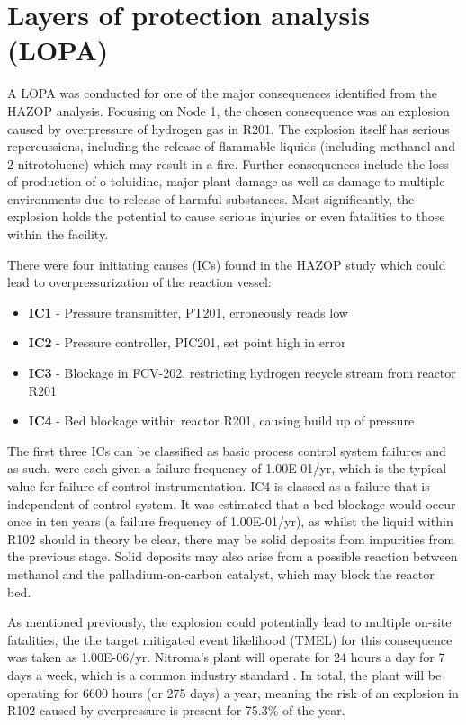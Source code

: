 \section{Layers of protection analysis (LOPA)}
\label{sec:LOPA}

A LOPA was conducted for one of the major consequences identified from the HAZOP analysis. Focusing on Node 1, the chosen consequence was an explosion caused by overpressure of hydrogen gas in R201. The explosion itself has serious repercussions, including the release of flammable liquids (including methanol and 2-nitrotoluene) which may result in a fire. Further consequences include the loss of production of o-toluidine, major plant damage as well as damage to multiple environments due to release of harmful substances. Most significantly, the explosion holds the potential to cause serious injuries or even fatalities to those within the facility. 

There were four initiating causes (ICs) found in the HAZOP study which could lead to overpressurization of the reaction vessel:

\begin{itemize}
\item \textbf{IC1} - Pressure transmitter, PT201, erroneously reads low 
\item \textbf{IC2} -  Pressure controller, PIC201, set point high in error
\item \textbf{IC3 }- Blockage in FCV-202, restricting hydrogen recycle stream from reactor R201 
\item \textbf{IC4} - Bed blockage within reactor R201, causing build up of pressure 
\end{itemize}

The first three ICs can be classified as basic process control system failures and as such, were each given a failure frequency of \nu1.00E-01/yr, which is the typical value for failure of control instrumentation. IC4 is classed as a failure that is independent of control system. It was estimated that a bed blockage would occur once in ten years (a failure frequency of 1.00E-01/yr), as whilst the liquid within R102 should in theory be clear, there may be solid deposits from impurities from the previous stage. Solid deposits may also arise from a possible reaction between methanol and the palladium-on-carbon catalyst, which may block the reactor bed. 

As mentioned previously, the explosion could potentially lead to multiple on-site fatalities, the the target mitigated event likelihood (TMEL) for this consequence was taken as 1.00E-06/yr. Nitroma's plant will operate for 24 hours a day for 7 days a week, which is a common industry standard \cite{job_guide_chemical_2021}. In total, the plant will be operating for 6600 hours (or 275 days) a year, meaning the risk of an explosion in R102 caused by overpressure is present for 75.3\% of the year.  
 
